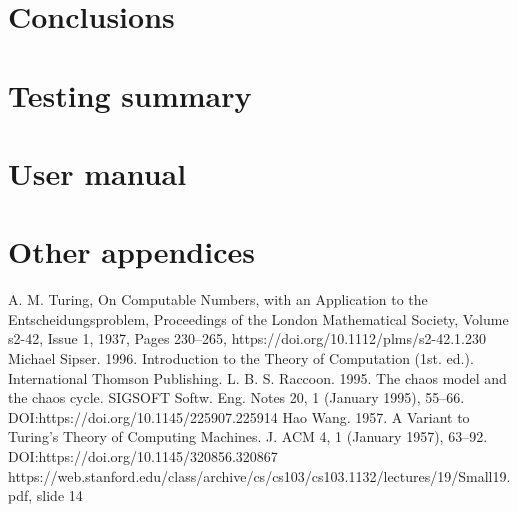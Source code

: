 \documentclass[11pt]{article}
\begin{document}
\section{Conclusions}



\section{Testing summary}



\section{User manual}



\section{Other appendices}

\begin{thebibliography}{9}
	A. M. Turing, On Computable Numbers, with an Application to the Entscheidungsproblem, Proceedings of the London Mathematical Society, Volume s2-42, Issue 1, 1937, Pages 230–265, https://doi.org/10.1112/plms/s2-42.1.230
	Michael Sipser. 1996. Introduction to the Theory of Computation (1st. ed.). International Thomson Publishing.
	L. B. S. Raccoon. 1995. The chaos model and the chaos cycle. SIGSOFT Softw. Eng. Notes 20, 1 (January 1995), 55–66. DOI:https://doi.org/10.1145/225907.225914
	Hao Wang. 1957. A Variant to Turing’s Theory of Computing Machines. J. ACM 4, 1 (January 1957), 63–92. DOI:https://doi.org/10.1145/320856.320867
	https://web.stanford.edu/class/archive/cs/cs103/cs103.1132/lectures/19/Small19.pdf, slide 14
\end{thebibliography}
\end{document}
